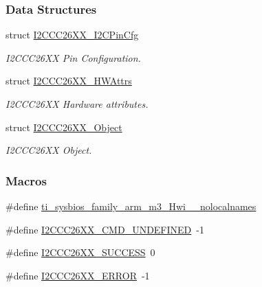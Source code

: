 \subsubsection*{Data Structures}
\begin{DoxyCompactItemize}
\item 
struct \hyperlink{struct_i2_c_c_c26_x_x___i2_c_pin_cfg}{I2\-C\-C\-C26\-X\-X\-\_\-\-I2\-C\-Pin\-Cfg}
\begin{DoxyCompactList}\small\item\em I2\-C\-C\-C26\-X\-X Pin Configuration. \end{DoxyCompactList}\item 
struct \hyperlink{struct_i2_c_c_c26_x_x___h_w_attrs}{I2\-C\-C\-C26\-X\-X\-\_\-\-H\-W\-Attrs}
\begin{DoxyCompactList}\small\item\em I2\-C\-C\-C26\-X\-X Hardware attributes. \end{DoxyCompactList}\item 
struct \hyperlink{struct_i2_c_c_c26_x_x___object}{I2\-C\-C\-C26\-X\-X\-\_\-\-Object}
\begin{DoxyCompactList}\small\item\em I2\-C\-C\-C26\-X\-X Object. \end{DoxyCompactList}\end{DoxyCompactItemize}
\subsubsection*{Macros}
\begin{DoxyCompactItemize}
\item 
\#define \hyperlink{_i2_c_c_c26_x_x_8h_aaa17ecf48f5762e2e1bdb0bab8aacf0c}{ti\-\_\-sysbios\-\_\-family\-\_\-arm\-\_\-m3\-\_\-\-Hwi\-\_\-\-\_\-nolocalnames}
\item 
\#define \hyperlink{_i2_c_c_c26_x_x_8h_a608c11d9086ef509bc173d18659f1014}{I2\-C\-C\-C26\-X\-X\-\_\-\-C\-M\-D\-\_\-\-U\-N\-D\-E\-F\-I\-N\-E\-D}~-\/1
\item 
\#define \hyperlink{_i2_c_c_c26_x_x_8h_afa112ed4c00eb67f507b0ae891500b94}{I2\-C\-C\-C26\-X\-X\-\_\-\-S\-U\-C\-C\-E\-S\-S}~0
\item 
\#define \hyperlink{_i2_c_c_c26_x_x_8h_addac2f61431f42ea2f6ad3af0b9b6c98}{I2\-C\-C\-C26\-X\-X\-\_\-\-E\-R\-R\-O\-R}~-\/1
\end{DoxyCompactItemize}
